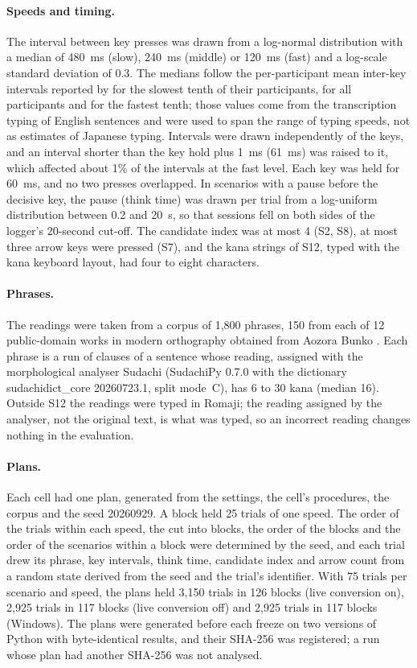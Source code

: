 \paragraph{Speeds and timing.} The interval between key presses was drawn from a log-normal distribution with a
median of 480~ms (slow), 240~ms (middle) or 120~ms (fast) and a log-scale standard deviation of 0.3. The medians
follow the per-participant mean inter-key intervals reported by \citet{dhakal2018} for the slowest tenth of their
participants, for all participants and for the fastest tenth; those values come from the transcription typing of
English sentences and were used to span the range of typing speeds, not as estimates of Japanese typing. Intervals
were drawn independently of the keys, and an interval shorter than the key hold plus 1~ms (61~ms) was raised to it,
which affected about 1\% of the intervals at the fast level. Each key was held for 60~ms, and no two presses
overlapped. In scenarios with a pause before the decisive key, the pause (think time) was drawn per trial from a
log-uniform distribution between 0.2 and 20~s, so that sessions fell on both sides of the logger's 20-second cut-off.
The candidate index was at most 4 (S2, S8), at most three arrow keys were pressed (S7), and the kana strings of S12,
typed with the kana keyboard layout, had four to eight characters.

\paragraph{Phrases.} The readings were taken from a corpus of 1{,}800 phrases, 150 from each of 12 public-domain works
in modern orthography obtained from Aozora Bunko \citep{aozora}. Each phrase is a run of clauses of a sentence whose
reading, assigned with the morphological analyser Sudachi \citep{takaoka2018} (SudachiPy 0.7.0 with the dictionary
sudachidict\_core 20260723.1, split mode~C), has 6 to 30 kana (median 16). Outside S12 the readings were typed in
Romaji; the reading assigned by the analyser, not the original text, is what was typed, so an incorrect reading
changes nothing in the evaluation.

\paragraph{Plans.} Each cell had one plan, generated from the settings, the cell's procedures, the corpus and the seed
20260929. A block held 25 trials of one speed. The order of the trials within each speed, the cut into blocks, the
order of the blocks and the order of the scenarios within a block were determined by the seed, and each trial drew its
phrase, key intervals, think time, candidate index and arrow count from a random state derived from the seed and the
trial's identifier. With 75 trials per scenario and speed, the plans held 3{,}150 trials in 126 blocks (live
conversion on), 2{,}925 trials in 117 blocks (live conversion off) and 2{,}925 trials in 117 blocks (Windows). The
plans were generated before each freeze on two versions of Python with byte-identical results, and their SHA-256 was
registered; a run whose plan had another SHA-256 was not analysed.

